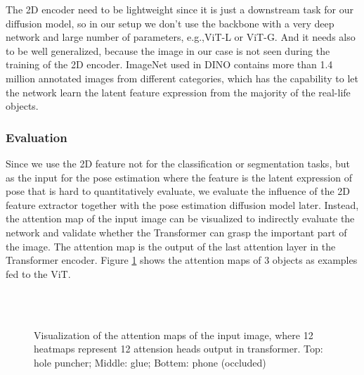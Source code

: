 \documentclass[12pt,DIV14,BCOR12mm,a4paper,footinclude=false,headinclude,parskip=half-,twoside,openright,cleardoublepage=empty,toc=index,bibliography=totoc,listof=totoc]{scrreprt}
\numberwithin{equation}{chapter}
\begin{document}
The 2D encoder need to be lightweight since it is just a downstream task for our diffusion model, so in our setup we don't use the backbone with a very deep network and large number of parameters, e.g.,ViT-L or ViT-G. And it needs also to be well generalized, because the image in our case is not seen during the training of the 2D encoder. ImageNet used in DINO contains more than 1.4 million annotated images from different categories, which has the capability to let the network learn the latent feature expression from the majority of the real-life objects. 

\subsubsection{Evaluation}
Since we use the 2D feature not for the classification or segmentation tasks, but as the input for the pose estimation where the feature is the latent expression of pose that is hard to quantitatively evaluate, we evaluate the influence of the 2D feature extractor together with the pose estimation diffusion model later. Instead, the attention map of the input image can be visualized to indirectly evaluate the network and validate whether the Transformer can grasp the important part of the image. The attention map is the output of the last attention layer in the Transformer encoder. Figure \ref{img:atten} shows the attention maps of 3 objects as examples fed to the ViT.

\begin{figure}[h]
  \centering
   \\
  \centering
   \\
  \centering
  \caption{Visualization of the attention maps of the input image, where 12 heatmaps represent 12 attension heads output in transformer. Top: hole puncher; Middle: glue; Bottem: phone (occluded)}
  \label{img:atten}
\end{figure}
\end{document}
